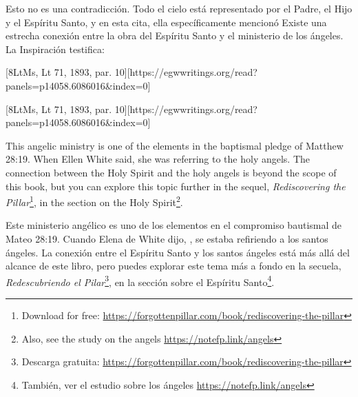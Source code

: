 Esto no es una contradicción. Todo el cielo está representado por el Padre, el Hijo y el Espíritu Santo, y en esta cita, ella específicamente mencionó  Existe una estrecha conexión entre la obra del Espíritu Santo y el ministerio de los ángeles. La Inspiración testifica:


[8LtMs, Lt 71, 1893, par. 10][https://egwwritings.org/read?panels=p14058.6086016&index=0]


[8LtMs, Lt 71, 1893, par. 10][https://egwwritings.org/read?panels=p14058.6086016&index=0]


This angelic ministry is one of the elements in the baptismal pledge of Matthew 28:19. When Ellen White said,  she was referring to the holy angels. The connection between the Holy Spirit and the holy angels is beyond the scope of this book, but you can explore this topic further in the sequel, \textit{Rediscovering the Pillar}\footnote{Download for free: \href{https://forgottenpillar.com/book/rediscovering-the-pillar}{https://forgottenpillar.com/book/rediscovering-the-pillar}}, in the section on the Holy Spirit\footnote{Also, see the study on the angels \href{https://notefp.link/angels}{https://notefp.link/angels}}.


Este ministerio angélico es uno de los elementos en el compromiso bautismal de Mateo 28:19. Cuando Elena de White dijo, , se estaba refiriendo a los santos ángeles. La conexión entre el Espíritu Santo y los santos ángeles está más allá del alcance de este libro, pero puedes explorar este tema más a fondo en la secuela, \textit{Redescubriendo el Pilar}\footnote{Descarga gratuita: \href{https://forgottenpillar.com/book/rediscovering-the-pillar}{https://forgottenpillar.com/book/rediscovering-the-pillar}}, en la sección sobre el Espíritu Santo\footnote{También, ver el estudio sobre los ángeles \href{https://notefp.link/angels}{https://notefp.link/angels}}.





% 

